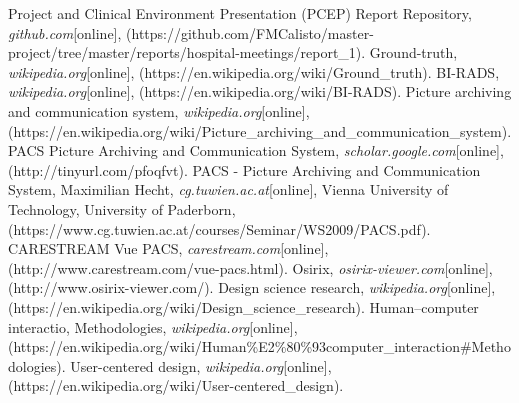 \begin{thebibliography}{}
 Project and Clinical Environment Presentation (PCEP) Report Repository, \emph{github.com}[online], (https://github.com/FMCalisto/master-project/tree/master/reports/hospital-meetings/report\_1).
 Ground-truth, \emph{wikipedia.org}[online], (https://en.wikipedia.org/wiki/Ground\_truth).
 BI-RADS, \emph{wikipedia.org}[online], (https://en.wikipedia.org/wiki/BI-RADS).
 Picture archiving and communication system, \emph{wikipedia.org}[online], (https://en.wikipedia.org/wiki/Picture\_archiving\_and\_communication\_system).
 PACS Picture Archiving and Communication System, \emph{scholar.google.com}[online], (http://tinyurl.com/pfoqfvt).
 PACS - Picture Archiving and Communication System, Maximilian Hecht, \emph{cg.tuwien.ac.at}[online], Vienna University of Technology, University of Paderborn, (https://www.cg.tuwien.ac.at/courses/Seminar/WS2009/PACS.pdf).
 CARESTREAM Vue PACS, \emph{carestream.com}[online], (http://www.carestream.com/vue-pacs.html).
 Osirix, \emph{osirix-viewer.com}[online], (http://www.osirix-viewer.com/).
 Design science research, \emph{wikipedia.org}[online], (https://en.wikipedia.org/wiki/Design\_science\_research).
 Human–computer interactio, Methodologies, \emph{wikipedia.org}[online], (https://en.wikipedia.org/wiki/Human\%E2\%80\%93computer\_interaction\#Methodologies).
 User-centered design, \emph{wikipedia.org}[online], (https://en.wikipedia.org/wiki/User-centered\_design).
\end{thebibliography}




